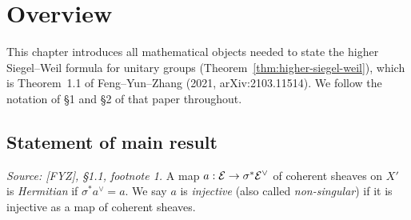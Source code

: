 \chapter{Overview}
\label{chap:overview}


This chapter introduces all mathematical objects needed to state the higher Siegel--Weil
formula for unitary groups (Theorem~\ref{thm:higher-siegel-weil}), which is Theorem~1.1
of Feng--Yun--Zhang (2021, arXiv:2103.11514).  We follow the notation of \S1 and \S2 of
that paper throughout.

\section{Statement of main result}

\begin{definition}
  \label{def:hermitian-map}
  \textit{Source: [FYZ], \S1.1, footnote 1.}
  A map \(a : \mathcal{E} \to \sigma^* \mathcal{E}^\vee\) of coherent sheaves on \(X'\) is
  \emph{Hermitian} if \(\sigma^* a^\vee = a\). We say \(a\) is \emph{injective}
  (also called \emph{non-singular}) if it is injective as a map of coherent sheaves.
\end{definition}

